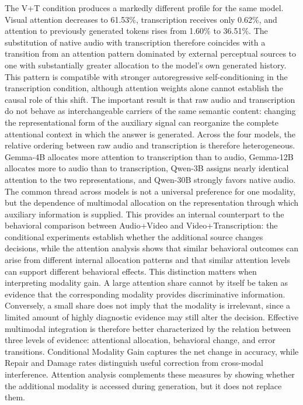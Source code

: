 The V+T condition produces a markedly different profile for the same model. Visual attention decreases to 61.53\%, transcription receives only 0.62\%, and attention to previously generated tokens rises from 1.60\% to 36.51\%. The substitution of native audio with transcription therefore coincides with a transition from an attention pattern dominated by external perceptual sources to one with substantially greater allocation to the model's own generated history. This pattern is compatible with stronger autoregressive self-conditioning in the transcription condition, although attention weights alone cannot establish the causal role of this shift. The important result is that raw audio and transcription do not behave as interchangeable carriers of the same semantic content: changing the representational form of the auxiliary signal can reorganize the complete attentional context in which the answer is generated.
Across the four models, the relative ordering between raw audio and transcription is therefore heterogeneous. Gemma-4B   allocates more attention to transcription than to audio, Gemma-12B allocates more to audio than to transcription, Qwen-3B assigns nearly identical attention to the two representations, and Qwen-30B strongly favors native audio. The common thread across models is not a universal preference for one modality, but the dependence of multimodal allocation on the representation through which auxiliary information is supplied. This provides an internal counterpart to the behavioral comparison between Audio+Video and Video+Transcription: the conditional experiments establish whether the additional source changes decisions, while the attention analysis shows that similar behavioral outcomes can arise from different internal allocation patterns and that similar attention levels can support different behavioral effects.
This distinction matters when interpreting modality gain. A large attention share cannot by itself be taken as evidence that the corresponding modality provides discriminative information. Conversely, a small share does not imply that the modality is irrelevant, since a limited amount of highly diagnostic evidence may still alter the decision. Effective multimodal integration is therefore better characterized by the relation between three levels of evidence: attentional allocation, behavioral change, and error transitions. Conditional Modality Gain captures the net change in accuracy, while Repair and Damage rates distinguish useful correction from cross-modal interference. Attention analysis complements these measures by showing whether the additional modality is accessed during generation, but it does not replace them.
